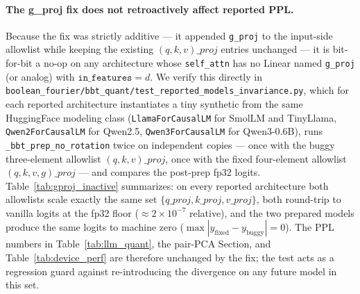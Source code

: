 \documentclass[11pt]{article}
\begin{document}
\paragraph{The g\_proj fix does not retroactively affect reported PPL.}
Because the fix was strictly additive --- it appended \texttt{g\_proj} to the input-side allowlist while keeping the existing $(q,k,v)\_proj$ entries unchanged --- it is bit-for-bit a no-op on any architecture whose \texttt{self\_attn} has no Linear named \texttt{g\_proj} (or analog) with $\texttt{in\_features} = d$. We verify this directly in \texttt{boolean\_fourier/bbt\_quant/test\_reported\_models\_invariance.py}, which for each reported architecture instantiates a tiny synthetic from the same HuggingFace modeling class (\texttt{LlamaForCausalLM} for SmolLM and TinyLlama, \texttt{Qwen2ForCausalLM} for Qwen2.5, \texttt{Qwen3ForCausalLM} for Qwen3-0.6B), runs \texttt{\_bbt\_prep\_no\_rotation} twice on independent copies --- once with the buggy three-element allowlist $(q,k,v)\_proj$, once with the fixed four-element allowlist $(q,k,v,g)\_proj$ --- and compares the post-prep fp32 logits. Table~\ref{tab:gproj_inactive} summarizes: on every reported architecture both allowlists scale exactly the same set $\{q\_proj, k\_proj, v\_proj\}$, both round-trip to vanilla logits at the fp32 floor ($\approx 2 \times 10^{-7}$ relative), and the two prepared models produce the same logits to machine zero ($\max|y_{\text{fixed}} - y_{\text{buggy}}| = 0$). The PPL numbers in Table~\ref{tab:llm_quant}, the pair-PCA Section, and Table~\ref{tab:device_perf} are therefore unchanged by the fix; the test acts as a regression guard against re-introducing the divergence on any future model in this set.
\end{document}
